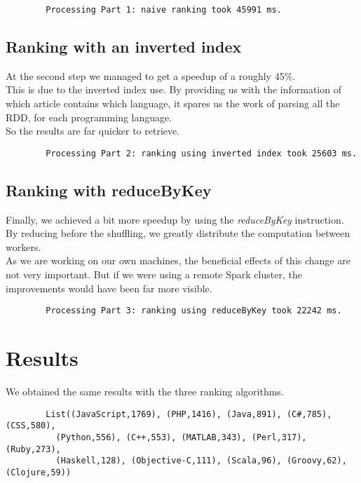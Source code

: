 \documentclass[a4paper]{article}
\begin{document}
	\begin{verbatim}
		Processing Part 1: naive ranking took 45991 ms.
	\end{verbatim}

	\subsection{Ranking with an inverted index}
	At the second step we managed to get a speedup of a roughly 45\%. \\
	This is due to the inverted index use. By providing us with the information of which article contains which language,
	it spares us the work of parsing all the RDD, for each programming language. \\
    So the results are far quicker to retrieve.

	\begin{verbatim}
		Processing Part 2: ranking using inverted index took 25603 ms.
	\end{verbatim}

	\subsection{Ranking with reduceByKey}
	Finally, we achieved a bit more speedup by using the \textit{reduceByKey} instruction. \\
	By reducing before the shuffling, we greatly distribute the computation between workers. \\
	As we are working on our own machines, the beneficial effects of this change are not very important.
	But if we were using a remote Spark cluster, the improvements would have been far more visible.

	\begin{verbatim}
		Processing Part 3: ranking using reduceByKey took 22242 ms.
	\end{verbatim}

	\section{Results}
	We obtained the same results with the three ranking algorithms.

	\begin{verbatim}
		List((JavaScript,1769), (PHP,1416), (Java,891), (C#,785), (CSS,580),
		  (Python,556), (C++,553), (MATLAB,343), (Perl,317), (Ruby,273),
		  (Haskell,128), (Objective-C,111), (Scala,96), (Groovy,62), (Clojure,59))
	\end{verbatim}
\end{document}
